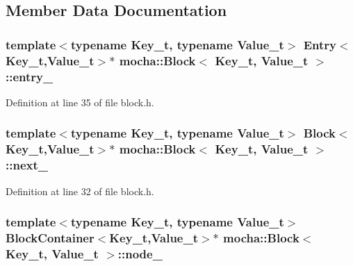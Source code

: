 \subsection{Member Data Documentation}
\hypertarget{classmocha_1_1_block_ada95cd41b7f920efd5edf47140b9111b}{
\subsubsection[{entry\_\-}]{\setlength{\rightskip}{0pt plus 5cm}template$<$typename Key\_\-t, typename Value\_\-t$>$ {\bf Entry}$<$Key\_\-t,Value\_\-t$>$$\ast$ {\bf mocha::Block}$<$ Key\_\-t, Value\_\-t $>$::{\bf entry\_\-}}}
\label{classmocha_1_1_block_ada95cd41b7f920efd5edf47140b9111b}


Definition at line 35 of file block.h.

\hypertarget{classmocha_1_1_block_a8c506f64ed0ff2476b5e0dc2e5d53f8d}{
\subsubsection[{next\_\-}]{\setlength{\rightskip}{0pt plus 5cm}template$<$typename Key\_\-t, typename Value\_\-t$>$ {\bf Block}$<$Key\_\-t,Value\_\-t$>$$\ast$ {\bf mocha::Block}$<$ Key\_\-t, Value\_\-t $>$::{\bf next\_\-}}}
\label{classmocha_1_1_block_a8c506f64ed0ff2476b5e0dc2e5d53f8d}


Definition at line 32 of file block.h.

\hypertarget{classmocha_1_1_block_a8293c90ec2083f03208cae2d88d69ea7}{
\subsubsection[{node\_\-}]{\setlength{\rightskip}{0pt plus 5cm}template$<$typename Key\_\-t, typename Value\_\-t$>$ {\bf BlockContainer}$<$Key\_\-t,Value\_\-t$>$$\ast$ {\bf mocha::Block}$<$ Key\_\-t, Value\_\-t $>$::{\bf node\_\-}}}
\label{classmocha_1_1_block_a8293c90ec2083f03208cae2d88d69ea7}


